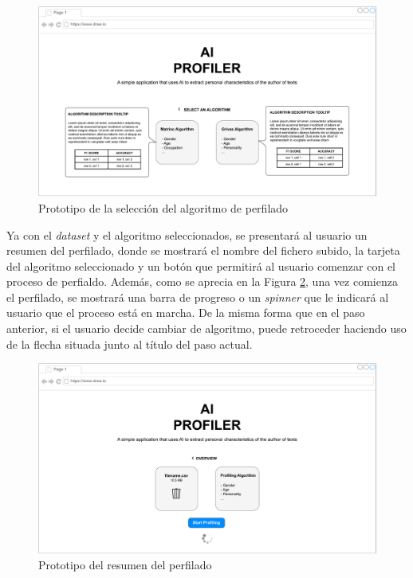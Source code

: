 \bigskip
\begin{figure}[H]
	\centering
	\includegraphics[width=\textwidth]{diagramas/landing-algorithm.pdf}
	\caption{Prototipo de la selección del algoritmo de perfilado}
	\label{fig:prototipo_algoritmo_perfilado}
\end{figure}

\bigskip
Ya con el \textit{dataset} y el algoritmo seleccionados, se presentará al usuario un resumen del perfilado, donde se mostrará
el nombre del fichero subido, la tarjeta del algoritmo seleccionado y un botón que permitirá al usuario comenzar con el proceso de perfialdo.
Además, como se aprecia en la Figura \ref{fig:prototipo_resumen_perfilado}, una vez comienza el perfilado, se mostrará una barra de progreso
o un \textit{spinner} que le indicará al usuario que el proceso está en marcha. De la misma forma que en el paso anterior, si el usuario
decide cambiar de algoritmo, puede retroceder haciendo uso de la flecha situada junto al título del paso actual.

\bigskip
\begin{figure}[H]
	\centering
	\includegraphics[width=\textwidth]{diagramas/landing-overview.pdf}
	\caption{Prototipo del resumen del perfilado}
	\label{fig:prototipo_resumen_perfilado}
\end{figure}

